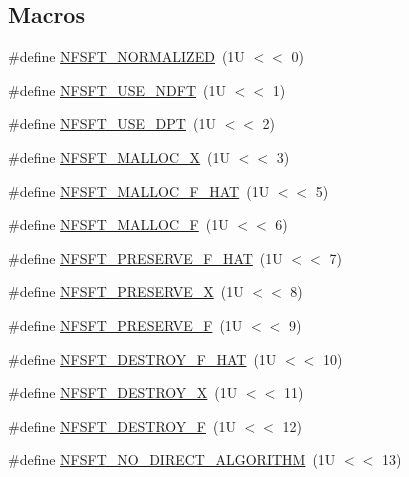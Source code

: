 \subsection*{Macros}
\begin{DoxyCompactItemize}
\item 
\#define \hyperlink{group__nfsft_ga65036f479a7421863956c02aa78bc9be}{N\-F\-S\-F\-T\-\_\-\-N\-O\-R\-M\-A\-L\-I\-Z\-E\-D}~(1\-U $<$$<$ 0)
\item 
\#define \hyperlink{group__nfsft_gaba029560a4a506c8f2dad185511db827}{N\-F\-S\-F\-T\-\_\-\-U\-S\-E\-\_\-\-N\-D\-F\-T}~(1\-U $<$$<$ 1)
\item 
\#define \hyperlink{group__nfsft_ga6b9eed1e7bcf862dcc3111509075fcbb}{N\-F\-S\-F\-T\-\_\-\-U\-S\-E\-\_\-\-D\-P\-T}~(1\-U $<$$<$ 2)
\item 
\#define \hyperlink{group__nfsft_ga02e4313d15b24c79e6802f853d452454}{N\-F\-S\-F\-T\-\_\-\-M\-A\-L\-L\-O\-C\-\_\-\-X}~(1\-U $<$$<$ 3)
\item 
\#define \hyperlink{group__nfsft_gab76dcf8db948f18cc87403dac804fc68}{N\-F\-S\-F\-T\-\_\-\-M\-A\-L\-L\-O\-C\-\_\-\-F\-\_\-\-H\-A\-T}~(1\-U $<$$<$ 5)
\item 
\#define \hyperlink{group__nfsft_gaf3bc3ab774cda0c1c765e97066893d30}{N\-F\-S\-F\-T\-\_\-\-M\-A\-L\-L\-O\-C\-\_\-\-F}~(1\-U $<$$<$ 6)
\item 
\#define \hyperlink{group__nfsft_gac8a292845f0bdec6b0d8ef6eb693a00e}{N\-F\-S\-F\-T\-\_\-\-P\-R\-E\-S\-E\-R\-V\-E\-\_\-\-F\-\_\-\-H\-A\-T}~(1\-U $<$$<$ 7)
\item 
\#define \hyperlink{group__nfsft_gacf7d73753b74dbf148167c3d46226f09}{N\-F\-S\-F\-T\-\_\-\-P\-R\-E\-S\-E\-R\-V\-E\-\_\-\-X}~(1\-U $<$$<$ 8)
\item 
\#define \hyperlink{group__nfsft_ga45962e763c2c551c1ea764a68b686b5c}{N\-F\-S\-F\-T\-\_\-\-P\-R\-E\-S\-E\-R\-V\-E\-\_\-\-F}~(1\-U $<$$<$ 9)
\item 
\#define \hyperlink{group__nfsft_gaa808899fc4db422c7b23470e6baad904}{N\-F\-S\-F\-T\-\_\-\-D\-E\-S\-T\-R\-O\-Y\-\_\-\-F\-\_\-\-H\-A\-T}~(1\-U $<$$<$ 10)
\item 
\#define \hyperlink{group__nfsft_ga6f22df0b292db920d795b3e3569181f2}{N\-F\-S\-F\-T\-\_\-\-D\-E\-S\-T\-R\-O\-Y\-\_\-\-X}~(1\-U $<$$<$ 11)
\item 
\#define \hyperlink{group__nfsft_ga2b32e2eabd33bf0886f6df45365d04c0}{N\-F\-S\-F\-T\-\_\-\-D\-E\-S\-T\-R\-O\-Y\-\_\-\-F}~(1\-U $<$$<$ 12)
\item 
\#define \hyperlink{group__nfsft_ga9ed987164acf6e362ab2878506fbca95}{N\-F\-S\-F\-T\-\_\-\-N\-O\-\_\-\-D\-I\-R\-E\-C\-T\-\_\-\-A\-L\-G\-O\-R\-I\-T\-H\-M}~(1\-U $<$$<$ 13)
$$
\end{DoxyCompactItemize}
